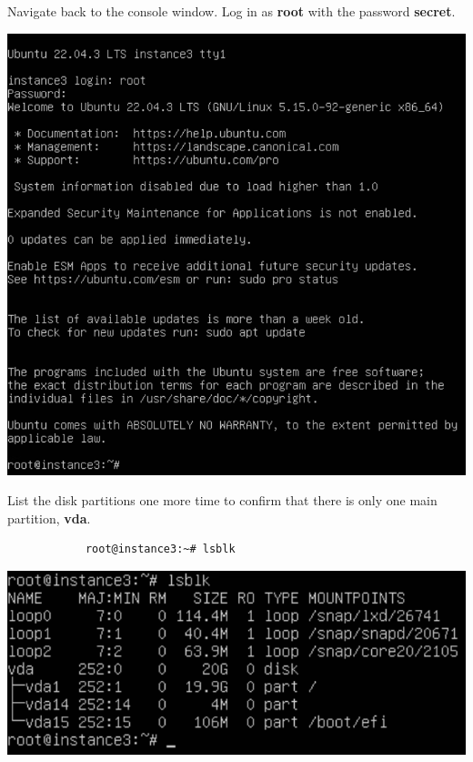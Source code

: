 \documentclass[letterpaper, 12pt]{article}
\begin{document}
\begin{enumerate}
    \begin{labstep}
        Navigate back to the console window.
        Log in as \textbf{root} with the password \textbf{secret}.

        \begin{center}
            \includegraphics[width=\linewidth]{images/part7/step23.png}
        \end{center}
    \end{labstep}

    \begin{labstep}
        List the disk partitions one more time to confirm that there is only one main partition, \textbf{vda}.
        \begin{lstlisting}
            root@instance3:~# lsblk
        \end{lstlisting}

        \begin{center}
            \includegraphics[width=\linewidth]{images/part7/step24.png}
        \end{center}
    \end{labstep}


\end{enumerate}
\end{document}
